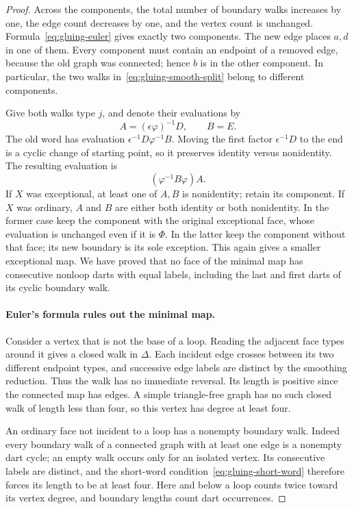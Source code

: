 \begin{proof}
Across the components, the total number of boundary walks increases
by one, the edge count decreases by one, and the vertex count is
unchanged.  Formula~\eqref{eq:gluing-euler} gives exactly two
components.  The new edge places $a,d$ in one of them.  Every component
must contain an endpoint of a removed edge, because the old graph was
connected; hence $b$ is in the other component.  In particular, the two
walks in~\eqref{eq:gluing-smooth-split} belong to different components.

Give both walks type $j$, and denote their evaluations by
\[
 A=(\epsilon\varphi)^{-1}D,\qquad B=E.
\]
The old word has evaluation $\epsilon^{-1}D\varphi^{-1}B$.
Moving the first factor $\epsilon^{-1}D$ to the end is a cyclic
change of starting point, so it preserves identity versus nonidentity.
The resulting evaluation is
\begin{equation}\label{eq:gluing-split-evaluation}
 (\varphi^{-1}B\varphi)A.
\end{equation}
If $X$ was exceptional, at least one of $A,B$ is nonidentity; retain
its component.  If $X$ was ordinary, $A$ and $B$ are either both
identity or both nonidentity.  In the former case keep the component
with the original exceptional face, whose evaluation is unchanged
even if it is $\Phi$.  In the latter keep the component without that
face; its new boundary is its sole exception.  This again gives a
smaller exceptional map.  We have proved that no face of the minimal
map has consecutive nonloop darts with equal labels, including the
last and first darts of its cyclic boundary walk.

\paragraph{Euler's formula rules out the minimal map.}
Consider a vertex that is not the base of a loop.  Reading the adjacent
face types around it gives a closed walk in $\Delta$.  Each incident
edge crosses between its two different endpoint types, and successive
edge labels are distinct by the smoothing reduction.  Thus the walk
has no immediate reversal.  Its length is positive since the connected
map has edges.  A simple triangle-free graph has no such closed walk
of length less than four, so this vertex has degree at least four.

An ordinary face not incident to a loop has a nonempty boundary walk.
Indeed every boundary walk of a connected graph with at least one
edge is a nonempty dart cycle; an empty walk occurs only for an isolated
vertex.  Its consecutive labels are distinct, and the short-word
condition~\eqref{eq:gluing-short-word} therefore forces its length to
be at least four.  Here and below a loop counts twice toward its
vertex degree, and boundary lengths count dart occurrences.


\end{proof}
